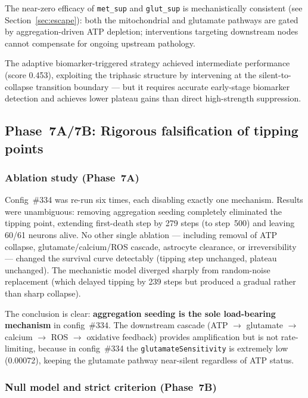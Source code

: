 \documentclass[12pt,a4paper]{article}
\begin{document}
The near-zero efficacy of \texttt{met\_sup} and \texttt{glut\_sup} is mechanistically consistent
(see Section~\ref{sec:escape}): both the mitochondrial and glutamate pathways are gated by
aggregation-driven ATP depletion; interventions targeting downstream nodes cannot compensate for
ongoing upstream pathology.

The adaptive biomarker-triggered strategy achieved intermediate performance (score 0.453),
exploiting the triphasic structure by intervening at the silent-to-collapse transition boundary
--- but it requires accurate early-stage biomarker detection and achieves lower plateau gains
than direct high-strength suppression.

\subsection{Phase~7A/7B: Rigorous falsification of tipping points}

\subsubsection{Ablation study (Phase~7A)}

Config~\#334 was re-run six times, each disabling exactly one mechanism. Results were
unambiguous: removing aggregation seeding completely eliminated the tipping point, extending
first-death step by 279 steps (to step~500) and leaving 60/61 neurons alive. No other single
ablation --- including removal of ATP collapse, glutamate/calcium/ROS cascade, astrocyte
clearance, or irreversibility --- changed the survival curve detectably (tipping step unchanged,
plateau unchanged). The mechanistic model diverged sharply from random-noise replacement (which
delayed tipping by 239 steps but produced a gradual rather than sharp collapse).

The conclusion is clear: \textbf{aggregation seeding is the sole load-bearing mechanism} in
config~\#334. The downstream cascade (ATP $\to$ glutamate $\to$ calcium $\to$ ROS $\to$
oxidative feedback) provides amplification but is not rate-limiting, because in config~\#334
the \texttt{glutamateSensitivity} is extremely low (0.00072), keeping the glutamate pathway
near-silent regardless of ATP status.

\subsubsection{Null model and strict criterion (Phase~7B)}
\end{document}
